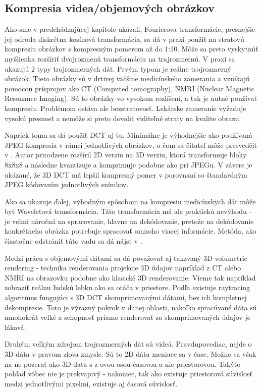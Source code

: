 \subsection{Kompresia videa/objemových obrázkov}

Ako sme v predchádzajúcej kapitole ukázali, Fourierova transformácie,
presnejšie jej odroda diskrétna kosínová transformácia, sa dá v praxi
použiť na stratovú kompresiu obrázkov s kompresným pomerom až do 1:10.
Môže sa preto vyskytnúť myšlienka rozšíriť dvojrozmenú transformáciu
na trajrozmernú.
V praxi sa ukazujú 2 typy trojrozmerných dát.
Prvým typom je reálne trojrozmerný obrázok. Tieto obrázky sú v drtivej
väčšine medicínskeho zamerania a vznikajú pomocou prísprojov ako CT
(Computed tomography), NMRI (Nuclear Magnetic Resonance Imaging).
Sú to obrázky vo vysokom rozlíšení, a tak je nutné používať kompresiu.
Problémom ostáva ale bezstratovosť. Lekárske zameranie vyžaduje vysokú
presnosť a nemôže si preto dovoliť viditeľné straty na kvalite obrazu.

Napriek tomu sa dá použiť DCT aj tu. Minimálne je výhodnejšie ako
používaná JPEG kompresia v rámci jednotlivých obrázkov, o čom sa
čitateľ môže presvedčiť v \cite{medical_dct}. 
Autor prirodzene rozšíril 2D verziu na 3D verziu, 
ktorá transformuje bloky 8x8x8 a následne kvantizuje a komprimuje
podobne ako pri JPEGu. V závere je ukázané, že 3D DCT má lepšií
kompresný pomer v porovnaní so štandardným JPEG kódovaním jednotlivých
snímkov.

Ako sa ukazuje ďalej, výhodným spôsobom na kompresiu medicínskych dát
môže byť Waveletová transformácia. Táto transformácia má ale praktickú
nevýhodu - je veľmi náročná na spracovanie, hlavne na dekódovanie,
pretože na dekódovanie konkrétneho obrázka potrebuje spracovať omnoho
viacej informácie. Metóda, ako čiastočne odstrániť túto vadu sa dá
nájsť v \cite{wavelet3d}.

Medzi prácu s objemovými dátami sa dá považovať aj takzvaný 3D volumetric
rendering - technika renderovania projekcie 3D údajov napríklad z CT
alebo NMRI na obrazovku podobne ako klasické 3D renderovanie. Vieme
tak napríklad zobraziť reálnu ľudskú lebku ako sa otáča v priestore.
Podľa \cite{volumdct} existuje raytracing algoritmus fungujúci s 3D DCT
skomprimovanými dátami, bez ich kompletnej dekompresie.
Toto je výrazný pokrok v danej oblasti, nakoľko spracúvané dáta sú
mnohokrát veľké a schopnosť priamo renderovať zo skomprimovaných
údajov je lákavá.

Druhým veľkým zdrojom trojrozmerných dát sú videá. Pravdupovediac,
nejde o 3D dáta v pravom zlova zmysle. Sú to 2D dáta meniace sa v
čase. Možno sa však na ne pozerať ako 3D data s z-ovou osou časovou a
nie priestorovou. Takýto pohľad vôbec nie je prekvapivý - nakoniec,
tak ako existuje priestorová súvislosť medzi jednotlivými pixelmi,
existuje aj časová súvislosť.

